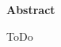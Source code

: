 \thispagestyle{empty}
\vspace{8cm}
\noindent
{\centerline {\bf \large Abstract}}
\vspace{1cm}
\noindent

ToDo